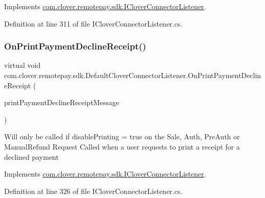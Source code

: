 Implements \hyperlink{interfacecom_1_1clover_1_1remotepay_1_1sdk_1_1_i_clover_connector_listener_aad5540cbd5e7a4a80ae2cc562013cc98}{com.\+clover.\+remotepay.\+sdk.\+I\+Clover\+Connector\+Listener}.



Definition at line 311 of file I\+Clover\+Connector\+Listener.\+cs.

\mbox{\label{classcom_1_1clover_1_1remotepay_1_1sdk_1_1_default_clover_connector_listener_a5c37faa1b2fd5dfc6c5ea0aa85c32d50}} 
\subsubsection{\texorpdfstring{On\+Print\+Payment\+Decline\+Receipt()}{OnPrintPaymentDeclineReceipt()}}
{\footnotesize\ttfamily virtual void com.\+clover.\+remotepay.\+sdk.\+Default\+Clover\+Connector\+Listener.\+On\+Print\+Payment\+Decline\+Receipt (\begin{DoxyParamCaption}\item[{\hyperlink{classcom_1_1clover_1_1remotepay_1_1sdk_1_1_print_payment_decline_receipt_message}{Print\+Payment\+Decline\+Receipt\+Message}}]{print\+Payment\+Decline\+Receipt\+Message }\end{DoxyParamCaption})\hspace{0.3cm}{\ttfamily [virtual]}}



Will only be called if disable\+Printing = true on the Sale, Auth, Pre\+Auth or Manual\+Refund Request Called when a user requests to print a receipt for a declined payment 



Implements \hyperlink{interfacecom_1_1clover_1_1remotepay_1_1sdk_1_1_i_clover_connector_listener_a3f1e0e6bd2b019c4e1ecbbb39078d0a7}{com.\+clover.\+remotepay.\+sdk.\+I\+Clover\+Connector\+Listener}.



Definition at line 326 of file I\+Clover\+Connector\+Listener.\+cs.

